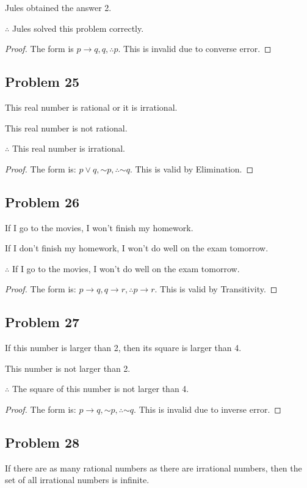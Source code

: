 \documentclass[14pt]{extarticle}
\begin{document}
Jules obtained the answer 2.

$\therefore$ Jules solved this problem correctly.

\begin{proof}
The form is $p \to q, q, \therefore p$. This is invalid due to converse error.
\end{proof}

\subsection{Problem 25}
This real number is rational or it is irrational.

This real number is not rational.

$\therefore$ This real number is irrational.

\begin{proof}
The form is: $p \vee q, {\sim p}, \therefore {\sim q}$. This is valid by
Elimination.
\end{proof}

\subsection{Problem 26}
If I go to the movies, I won’t finish my homework.

If I don’t finish my homework, I won’t do well on the exam tomorrow.

$\therefore$ If I go to the movies, I won’t do well on the exam tomorrow.

\begin{proof}
The form is: $p \to q, q \to r, \therefore p \to r$. This is valid by
Transitivity.
\end{proof}

\subsection{Problem 27}
If this number is larger than 2, then its square is larger than 4.

This number is not larger than 2.

$\therefore$ The square of this number is not larger than 4.

\begin{proof}
The form is: $p \to q, {\sim p}, \therefore {\sim q}$. This is invalid due to
inverse error.
\end{proof}

\subsection{Problem 28}
If there are as many rational numbers as there are irrational numbers, then the
set of all irrational numbers is infinite.
\end{document}
